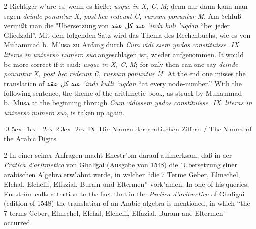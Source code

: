 \documentclass[10pt,a4paper]{article}
\makeatletter
\renewcommand{\switchcolumn}{\syncronize\nointerlineskip\columnbreak}
\newcommand{\RL}[1]{\beginR#1\endR}
\newcommand{\ar}[1]{{\arabicfont\RL{#1}}}
\renewcommand{\section}{\@startsection{section}{1}{\z@}%
  {-3.5ex \@plus -1ex \@minus -.2ex}%
  {2.3ex \@plus .2ex}%
  {\normalfont\Large\bfseries\color{sectioncolor}}}
\newcommand{\enquote}[1]{``#1''}
\makeatother
\begin{document}
\begin{paracol}{2}
Richtiger w"are es, wenn es hie\ss{}e: \textit{usque in X, C, M}; denn nur dann kann man sagen \textit{deinde ponuntur X, post hec redeunt C, rursum ponuntur M}. Am Schlu\ss{} vermi\ss{}t man die "Ubersetzung von \ar{عند كل عقد} \textit{'inda kuli 'uqd\=an} \enquote{bei jeder Gliedzahl}. Mit dem folgenden Satz wird das Thema des Rechenbuchs, wie es von Muhammad b.\ M"us\=a zu Anfang durch \textit{Cum vidi ssem yndos constituisse .IX. literas in universo numero suo} angeschlagen ist, wieder aufgenommen.
\switchcolumn
It would be more correct if it said: \textit{usque in X, C, M}; for only then can one say \textit{deinde ponuntur X, post hec redeunt C, rursum ponuntur M}. At the end one misses the translation of \ar{عند كل عقد} \textit{`inda kulli `uqd\=an} ``at every node-number.'' With the following sentence, the theme of the arithmetic book, as struck by Mu\d{h}ammad b.\ M\=us\=a at the beginning through \textit{Cum vidissem yndos constituisse .IX. literas in universo numero suo}, is taken up again.
\end{paracol}
\clearpage

\section{IX. Die Namen der arabischen Ziffern / The Names of the Arabic Digits}

\begin{paracol}{2}
In einer seiner Anfragen macht Enestr"om darauf aufmerksam, da\ss{} in der \textit{Pratica d'aritmetica} von Ghaligai (Ausgabe von 1548) die "Ubersetzung einer arabischen Algebra erw"ahnt werde, in welcher \enquote{die 7 Terme Geber, Elmechel, Elchal, Elchelif, Elfazial, Buram und Eltermen} vork"amen.
\switchcolumn
In one of his queries, Enestr\"om calls attention to the fact that in the \textit{Pratica d'aritmetica} of Ghaligai (edition of 1548) the translation of an Arabic algebra is mentioned, in which ``the 7 terms Geber, Elmechel, Elchal, Elchelif, Elfazial, Buram and Eltermen'' occurred.
\end{paracol}
\end{document}
